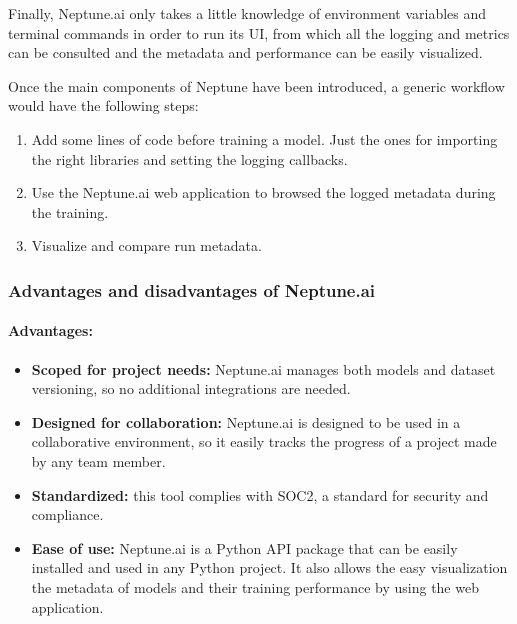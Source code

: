 Finally, Neptune.ai only takes a little knowledge of environment variables and terminal commands in order to run its \acrshort{UI}, from which all the logging and
metrics can be consulted and the metadata and performance can be easily visualized.

Once the main components of Neptune have been introduced, a generic workflow would have the following steps:

\begin{enumerate}
    \item Add some lines of code before training a model. Just the ones for importing the right libraries and setting the logging callbacks.
    \item Use the Neptune.ai web application to browsed the logged metadata during the training.
    \item Visualize and compare run metadata.
\end{enumerate}

\subsubsection{Advantages and disadvantages of Neptune.ai\cite{neptuneproscons}}

\paragraph{Advantages:}

\begin{itemize}
    \item \textbf{Scoped for project needs: }Neptune.ai manages both models and dataset versioning, so no additional integrations are needed.
    
    \item \textbf{Designed for collaboration: }Neptune.ai is designed to be used in a collaborative environment, so it easily tracks the progress of a project made by 
    any team member.

    \item \textbf{Standardized: }this tool complies with SOC2\cite{SOC2}, a standard for security and compliance.
    
    \item \textbf{Ease of use: }Neptune.ai is a Python API package that can be easily installed and used in any Python project. It also allows the easy visualization the
    metadata of models and their training performance by using the web application.
\end{itemize}

